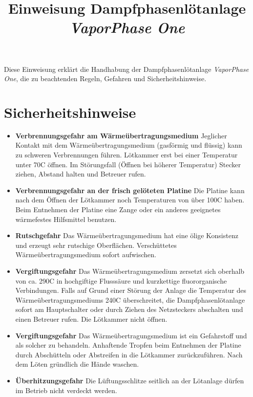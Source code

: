 \documentclass{\basedir/fablab-document}
\title{Einweisung Dampfphasenl{\"o}tanlage \textit{VaporPhase One}}
\makeatletter
\newcommand{\smaller}{\ifdim\f@size pt>10pt \small \fi}
\newcommand{\english}[1]{{\smaller \color{gray} \itshape #1}}
\renewcommand{\english}[1]{}
\makeatother
\begin{document}
	\maketitle

	Diese Einweisung erkl{\"a}rt die Handhabung der Dampfphasenl{\"o}tanlage \textit{VaporPhase One}, die zu beachtenden Regeln, Gefahren und Sicherheitshinweise.
	
	\english{This instruction explains use of the vapor phase soldering unit \textit{VaporPhase One}, and the associated rules, hazards and safety advice.}
	
	
	\section{Sicherheitshinweise}
	
	\begin{itemize}
	
	\item \textbf{Verbrennungsgefahr am Wärmeübertragungsmedium} Jeglicher Kontakt mit dem Wärmeübertragungsmedium (gasförmig und flüssig) kann zu schweren Verbrennungen führen. Lötkammer erst bei einer Temperatur unter 70\textdegree C öffnen. Im Störungsfall (Öffnen bei höherer Temperatur) Stecker ziehen, Abstand halten und Betreuer rufen.

	\item \textbf{Verbrennungsgefahr an der frisch gelöteten Platine} Die Platine kann nach dem {\"O}ffnen der L{\"o}tkammer noch Temperaturen von {\"u}ber 100\textdegree C haben. Beim Entnehmen der Platine eine Zange oder ein anderes geeignetes w{\"a}rmefestes Hilfsmittel benutzen.
	\item \textbf{Rutschgefahr} Das W{\"a}rme{\"u}bertragungsmedium hat eine {\"o}lige Konsistenz und erzeugt sehr rutschige Oberfl{\"a}chen. Verschüttetes Wärmeübertragungsmedium sofort aufwischen.
	\item \textbf{Vergiftungsgefahr} Das W{\"a}rme{\"u}bertragungsmedium zersetzt sich oberhalb von ca. 290\textdegree C in hochgiftige Flusss{\"a}ure und kurzkettige fluororganische Verbindungen. Falls auf Grund einer Störung der Anlage die Temperatur des W{\"a}rme{\"u}bertragungsmediums 240\textdegree C {\"u}berschreitet, die Dampfphasenl{\"o}tanlage sofort am Hauptschalter oder durch Ziehen des Netzsteckers abschalten und einen Betreuer rufen. Die L{\"o}tkammer nicht {\"o}ffnen.
	\item \textbf{Vergiftungsgefahr} Das W{\"a}rme{\"u}bertragungsmedium ist ein Gefahrstoff und als solcher zu behandeln. Anhaftende Tropfen beim Entnehmen der Platine durch Absch{\"u}tteln oder Abstreifen in die L{\"o}tkammer zur{\"u}ckzuf{\"u}hren. Nach dem L{\"o}ten gr{\"u}ndlich die H{\"a}nde waschen.
	\item \textbf{Überhitzungsgefahr} Die Lüftungsschlitze seitlich an der Lötanlage dürfen im Betrieb nicht verdeckt werden.
	\end{itemize}
	
\end{document}

